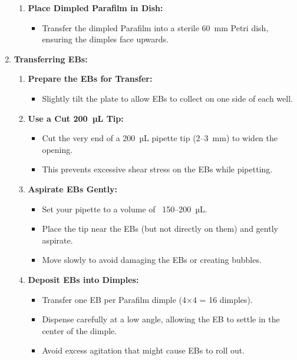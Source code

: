 \documentclass[11pt]{article}
\begin{document}
\begin{enumerate}[leftmargin=*]
\begin{enumerate}[leftmargin=*]
        \item \textbf{Place Dimpled Parafilm in Dish:}
        \begin{itemize}[leftmargin=*]
            \item Transfer the dimpled Parafilm into a sterile 60~mm Petri dish, ensuring the dimples face upwards.
        \end{itemize}
    \end{enumerate}

    \item \textbf{Transferring EBs:}
    \begin{enumerate}[leftmargin=*]
        \item \textbf{Prepare the EBs for Transfer:}
        \begin{itemize}[leftmargin=*]
            \item Slightly tilt the plate to allow EBs to collect on one side of each well.
        \end{itemize}

        \item \textbf{Use a Cut 200~µL Tip:}
        \begin{itemize}[leftmargin=*]
            \item Cut the very end of a 200~µL pipette tip (2–3~mm) to widen the opening.  
            \item This prevents excessive shear stress on the EBs while pipetting.
        \end{itemize}

        \item \textbf{Aspirate EBs Gently:}
        \begin{itemize}[leftmargin=*]
            \item Set your pipette to a volume of ~150–200~µL.
            \item Place the tip near the EBs (but not directly on them) and gently aspirate.  
            \item Move slowly to avoid damaging the EBs or creating bubbles.
        \end{itemize}

        \item \textbf{Deposit EBs into Dimples:}
        \begin{itemize}[leftmargin=*]
            \item Transfer one EB per Parafilm dimple (4×4 = 16 dimples).
            \item Dispense carefully at a low angle, allowing the EB to settle in the center of the dimple.  
            \item Avoid excess agitation that might cause EBs to roll out.
        \end{itemize}


\end{enumerate}
\end{enumerate}
\end{document}
